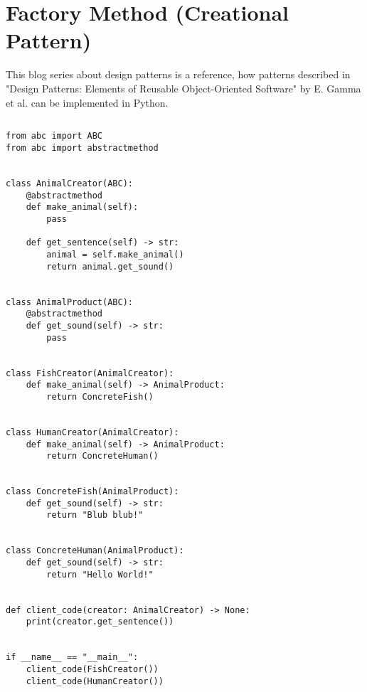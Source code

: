 \documentclass{article}
\begin{document}
  \section{Factory Method (Creational Pattern)}

  This blog series about design patterns is a reference, how patterns
  described in "Design Patterns: Elements of Reusable Object-Oriented Software"
  by E. Gamma et al. can be implemented in Python.

  \subsection{}

  \begin{lstlisting}
from abc import ABC
from abc import abstractmethod


class AnimalCreator(ABC):
    @abstractmethod
    def make_animal(self):
        pass

    def get_sentence(self) -> str:
        animal = self.make_animal()
        return animal.get_sound()


class AnimalProduct(ABC):
    @abstractmethod
    def get_sound(self) -> str:
        pass


class FishCreator(AnimalCreator):
    def make_animal(self) -> AnimalProduct:
        return ConcreteFish()


class HumanCreator(AnimalCreator):
    def make_animal(self) -> AnimalProduct:
        return ConcreteHuman()


class ConcreteFish(AnimalProduct):
    def get_sound(self) -> str:
        return "Blub blub!"


class ConcreteHuman(AnimalProduct):
    def get_sound(self) -> str:
        return "Hello World!"


def client_code(creator: AnimalCreator) -> None:
    print(creator.get_sentence())


if __name__ == "__main__":
    client_code(FishCreator())
    client_code(HumanCreator())
  \end{lstlisting}
\end{document}
